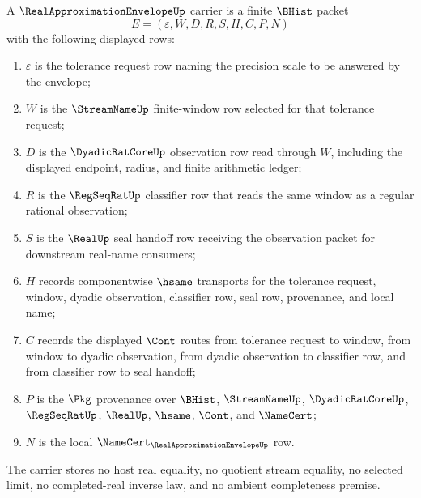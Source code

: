 \begin{definition}
\label{def:real-approximation-envelope-carrier}
A $\RealApproximationEnvelopeUp$ carrier is a finite $\BHist$ packet
$$
E=(\varepsilon,W,D,R,S,H,C,P,N)
$$
with the following displayed rows:
\begin{enumerate}
\item $\varepsilon$ is the tolerance request row naming the precision scale to be answered by the envelope;
\item $W$ is the $\StreamNameUp$ finite-window row selected for that tolerance request;
\item $D$ is the $\DyadicRatCoreUp$ observation row read through $W$, including the displayed endpoint, radius, and finite arithmetic ledger;
\item $R$ is the $\RegSeqRatUp$ classifier row that reads the same window as a regular rational observation;
\item $S$ is the $\RealUp$ seal handoff row receiving the observation packet for downstream real-name consumers;
\item $H$ records componentwise $\hsame$ transports for the tolerance request, window, dyadic observation, classifier row, seal row, provenance, and local name;
\item $C$ records the displayed $\Cont$ routes from tolerance request to window, from window to dyadic observation, from dyadic observation to classifier row, and from classifier row to seal handoff;
\item $P$ is the $\Pkg$ provenance over $\BHist$, $\StreamNameUp$, $\DyadicRatCoreUp$, $\RegSeqRatUp$, $\RealUp$, $\hsame$, $\Cont$, and $\NameCert$;
\item $N$ is the local $\NameCert_{\RealApproximationEnvelopeUp}$ row.
\end{enumerate}
The carrier stores no host real equality, no quotient stream equality, no selected limit, no completed-real inverse law, and no ambient completeness premise.
\end{definition}

